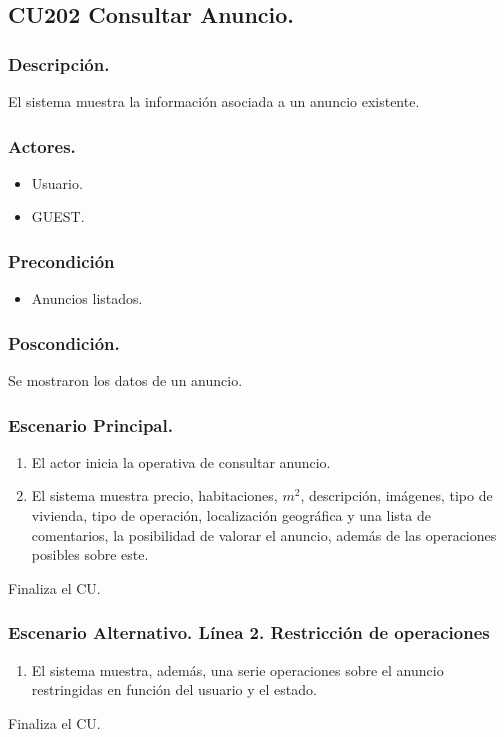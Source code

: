 \subsection{CU202 Consultar Anuncio.}
\subsubsection{Descripci\'{o}n.}
El sistema muestra la informaci\'{o}n asociada a un anuncio existente.
\subsubsection{Actores.}
\begin{itemize}
\item Usuario.
\item GUEST.
\end{itemize}
\subsubsection{Precondici\'{o}n}
\begin{itemize}
\item Anuncios listados.
\end{itemize}
\subsubsection{Poscondici\'{o}n.}
Se mostraron los datos de un anuncio.
\subsubsection{Escenario Principal.}
\begin{enumerate}
\item El actor inicia la operativa de consultar anuncio.
\item El sistema muestra precio, habitaciones, $m^{2}$, descripci\'{o}n, im\'{a}genes, tipo de vivienda, tipo de operaci\'{o}n, localizaci\'{o}n geogr\'{a}fica y una lista de comentarios, la posibilidad de valorar el anuncio, adem\'{a}s de las operaciones posibles sobre este.
\end{enumerate}
Finaliza el CU.
\subsubsection{Escenario Alternativo. L\'{i}nea 2. Restricci\'{o}n de operaciones}
\begin{enumerate}
\item El sistema muestra, adem\'{a}s, una serie operaciones sobre el anuncio restringidas en funci\'{o}n del usuario y el estado.
\end{enumerate}
Finaliza el CU.
